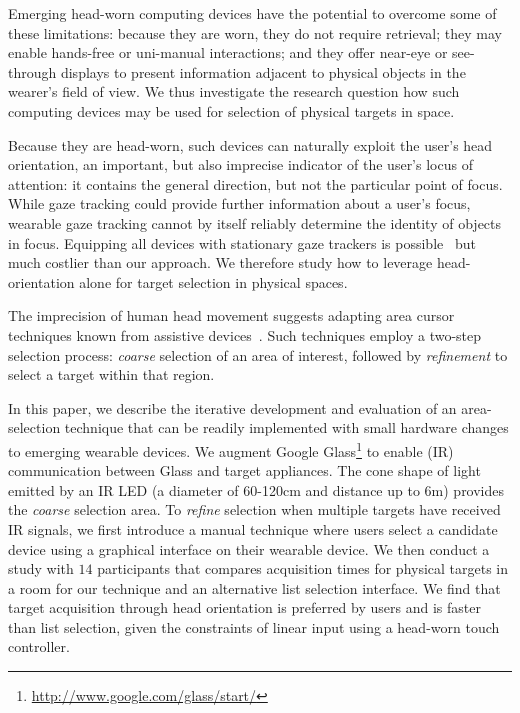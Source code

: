 Emerging head-worn computing devices have the potential to overcome some of these limitations: because they are worn, they do not require retrieval; they may enable hands-free or uni-manual interactions; and they offer near-eye or see-through displays to present information adjacent to physical objects in the wearer's field of view. We thus investigate the research question how such computing devices may be used for selection of physical targets in space.

Because they are head-worn, such devices can naturally exploit the user's head orientation, an important, but also imprecise indicator of the user's locus of attention: it contains the general direction, but not the particular point of focus. While gaze tracking could provide further information about a user's focus, wearable gaze tracking cannot by itself reliably determine the identity of objects in focus. Equipping all devices with stationary gaze trackers is possible~\cite{vertegaal2005media} but much costlier than our approach. We therefore study how to leverage head-orientation alone for target selection in physical spaces. 

The imprecision of human head movement suggests adapting area cursor techniques known from assistive devices~\cite{kabbash1995prince,worden1997making,findlater2010enhanced}. Such techniques employ a two-step selection process: {\em coarse} selection of an area of interest, followed by {\em refinement} to select a target within that region.

In this paper, we describe the iterative development and evaluation of an area-selection technique that can be readily implemented with small hardware changes to emerging wearable devices. We augment Google Glass\footnote{\url{http://www.google.com/glass/start/}} to enable (IR) communication between Glass and target appliances. The cone shape of light emitted by an IR LED (a diameter of 60-120cm and distance up to 6m) provides the {\em coarse} selection area. To {\em refine} selection when multiple targets have received IR signals, we first introduce a manual technique where users select a candidate device using a graphical interface on their wearable device.  We then conduct a study with $14$ participants that compares acquisition times for physical targets in a room for our technique and an alternative list selection interface. We find that target acquisition through head orientation is preferred by users and is faster than list selection, given the constraints of linear input using a head-worn touch controller. 

